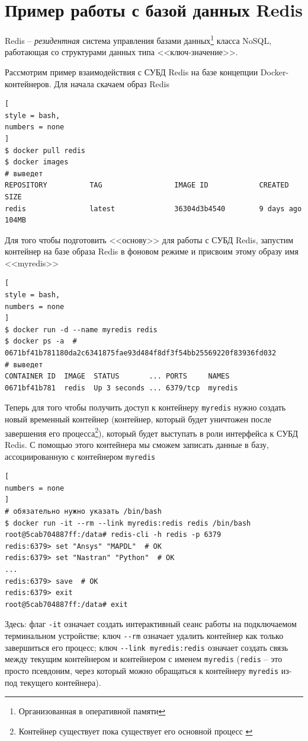 \documentclass[%
	11pt,
	a4paper,
	utf8,
		]{article}
\begin{document}
\section{Пример работы с базой данных Redis}

Redis -- \emph{резидентная} система управления базами данных\footnote{Организованная в оперативной памяти} класса NoSQL, работающая со структурами данных типа <<ключ-значение>>.

Рассмотрим пример взаимодействия с СУБД Redis на базе концепции Docker-контейнеров. Для начала скачаем образ Redis
\begin{lstlisting}[
style = bash,
numbers = none
]
$ docker pull redis
$ docker images
# выведет
REPOSITORY          TAG                 IMAGE ID            CREATED             SIZE
redis               latest              36304d3b4540        9 days ago          104MB
\end{lstlisting}

Для того чтобы подготовить <<основу>> для работы с СУБД Redis, запустим контейнер на базе образа Redis в фоновом режиме и присвоим этому образу имя <<myredis>>
\begin{lstlisting}[
style = bash,
numbers = none
]
$ docker run -d --name myredis redis
$ docker ps -a  # 0671bf41b781180da2c6341875fae93d484f8df3f54bb25569220f83936fd032
# выведет
CONTAINER ID  IMAGE  STATUS       ... PORTS     NAMES
0671bf41b781  redis  Up 3 seconds ... 6379/tcp  myredis
\end{lstlisting}

Теперь для того чтобы получить доступ к контейнеру \texttt{myredis} нужно создать новый временный контейнер (контейнер, который будет уничтожен после завершения его процесса\footnote{Контейнер существует пока существует его основной процесс \cite{mouat:docker-2017}}), который будет выступать в роли интерфейса к СУБД Redis. С помощью этого контейнера мы сможем записать данные в базу, ассоциированную с контейнером \texttt{myredis}
\begin{lstlisting}[
numbers = none
]
# обязательно нужно указать /bin/bash
$ docker run -it --rm --link myredis:redis redis /bin/bash
root@5cab704887ff:/data# redis-cli -h redis -p 6379
redis:6379> set "Ansys" "MAPDL"  # OK
redis:6379> set "Nastran" "Python"  # OK
...
redis:6379> save  # OK
redis:6379> exit
root@5cab704887ff:/data# exit
\end{lstlisting}

Здесь: флаг \verb|-it| означает создать интерактивный сеанс работы на подключаемом терминальном устройстве; ключ \verb|--rm| означает удалить контейнер как только завершиться его процесс; ключ \verb|--link myredis:redis| означает создать связь между текущим контейнером и контейнером с именем \texttt{myredis} (\texttt{redis} -- это просто псевдоним, через который можно обращаться к контейнеру \texttt{myredis} из-под текущего контейнера).
\end{document}
